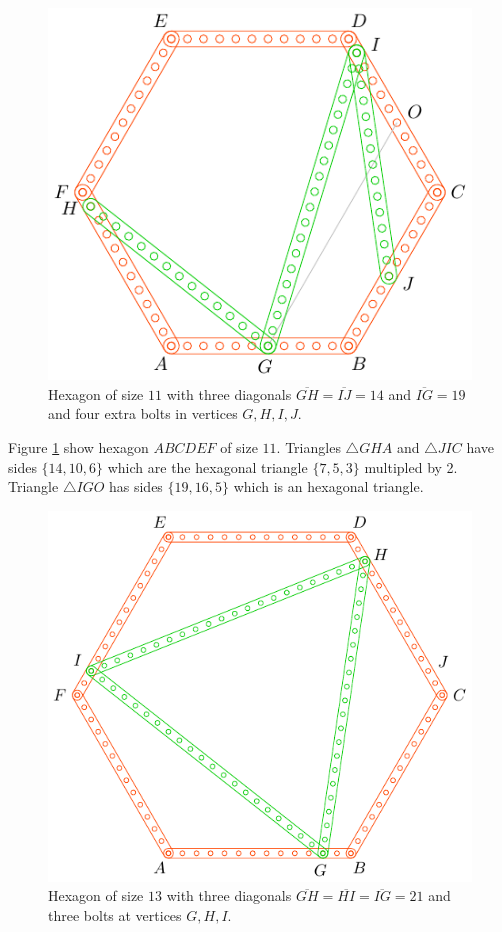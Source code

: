 \documentclass[11pt]{article}
\begin{document}
\begin{figure}[H]
\centering
\includegraphics[scale=1]{11/hexa-11a}
\caption{Hexagon of size $11$ with three diagonals $\overline{GH} = \overline{IJ} = 14$ and $\overline{IG} = 19$ and four extra bolts in vertices $G,H,I,J$.}
\label{fig:11a}
\end{figure}

Figure \ref{fig:11a} show hexagon $ABCDEF$ of size $11$. Triangles $\triangle{GHA}$ and $\triangle{JIC}$ have sides $\{14,10,6\}$ which are the hexagonal triangle $\{7,5,3\}$ multipled by 2. Triangle $\triangle{IGO}$ has sides $\{19,16,5\}$ which is an hexagonal triangle.


\begin{figure}[H]
\centering
\includegraphics[scale=1]{13/hexa-13a}
\caption{Hexagon of size $13$ with three diagonals $\overline{GH} = \overline{HI} = \overline{IG} = 21$ and three bolts at vertices $G,H,I$.}
\label{fig:13a}
\end{figure}
\end{document}
